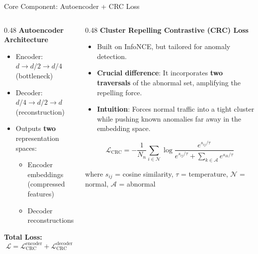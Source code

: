 \documentclass[aspectratio=169]{beamer}
\begin{document}
\begin{frame}{Core Component: Autoencoder + CRC Loss}
    \begin{columns}[T]
        \begin{column}{0.48\textwidth}
            \textbf{Autoencoder Architecture}
            \begin{itemize}
                \item Encoder: $d \to d/2 \to d/4$ (bottleneck)
                \item Decoder: $d/4 \to d/2 \to d$ (reconstruction)
                \item Outputs \textbf{two} representation spaces:
                \begin{itemize}
                    \item Encoder embeddings (compressed features)
                    \item Decoder reconstructions
                \end{itemize}
            \end{itemize}

            \vspace{0.3cm}
            \textbf{Total Loss:}
            \[
                \mathcal{L} = \mathcal{L}_{\text{CRC}}^{\text{encoder}} + \mathcal{L}_{\text{CRC}}^{\text{decoder}}
            \]
        \end{column}
        \begin{column}{0.48\textwidth}
            \textbf{Cluster Repelling Contrastive (CRC) Loss}
            \begin{itemize}
                \item Built on InfoNCE, but tailored for anomaly detection.
                \item \textbf{Crucial difference}: It incorporates \textbf{two traversals} of the abnormal set, amplifying the repelling force.
                \item \textbf{Intuition}: Forces normal traffic into a tight cluster while pushing known anomalies far away in the embedding space.
            \end{itemize}

            \vspace{0.2cm}
            \[
                \mathcal{L}_{\text{CRC}} = -\frac{1}{N_n}\sum_{i \in \mathcal{N}} \log \frac{e^{s_{ij}/\tau}}{e^{s_{ij}/\tau} + \sum_{k \in \mathcal{A}} e^{s_{ik}/\tau}}
            \]

            \vspace{0.1cm}
            {\scriptsize where $s_{ij}$ = cosine similarity, $\tau$ = temperature, $\mathcal{N}$ = normal, $\mathcal{A}$ = abnormal}
        \end{column}
    \end{columns}
\end{frame}
\end{document}
